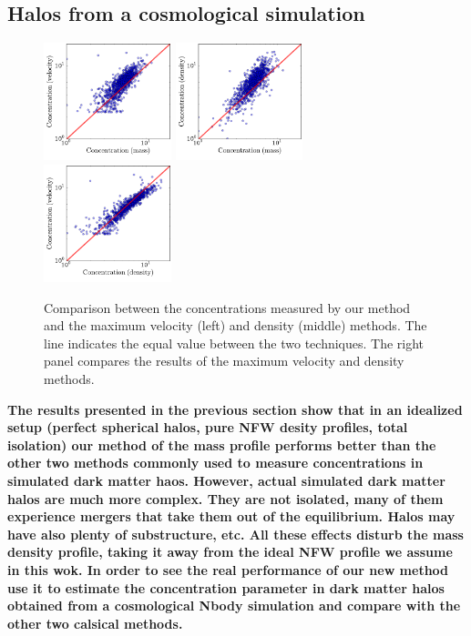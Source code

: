 \documentclass[a4,useAMS,usenatbib,usegraphicx]{mn2e}
\begin{document}
\subsection{Halos from a cosmological simulation}


\label{sec:data}
\begin{figure}
  \begin{center}
    \includegraphics[width=0.33\textwidth]{conc_mass_vel.pdf}
    \includegraphics[width=0.33\textwidth]{conc_mass_dens.pdf}
    \includegraphics[width=0.33\textwidth]{conc_dens_vel.pdf}
  \end{center}
  \caption{Comparison between the concentrations measured by our
    method and the maximum velocity (left) and density (middle)
    methods. The line indicates the equal value between the two
    techniques. The right panel compares the results of the maximum
    velocity and density methods.
  \label{fig:mdv}}
\end{figure}


{\bf The results presented in the previous section show that in an
  idealized setup (perfect spherical halos, pure NFW desity profiles,
  total isolation) our method of the mass profile performs better than
  the other two methods commonly used to measure concentrations in
  simulated dark matter haos. However, actual simulated dark matter
  halos are much more complex. They are not isolated, many of them
  experience mergers that take them out of the equilibrium. Halos may
  have also plenty of substructure, etc. All these effects disturb the
  mass density profile, taking it away from the ideal NFW profile we
  assume in this wok. In order to see the real performance of our new
  method use it to estimate the concentration parameter in dark matter
  halos obtained from a cosmological Nbody simulation and compare with
  the other two calsical methods.}
\end{document}
